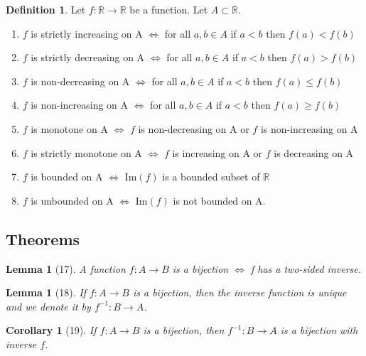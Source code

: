 \documentclass[12pt]{article}
\newtheorem{lem}[thm]{Lemma}  %
\newtheorem{cor}[thm]{Corollary}
\theoremstyle{definition}
\newtheorem{defn}[thm]{Definition}
\theoremstyle{remark}
\numberwithin{equation}{section}
\newcommand\R{\mathbb R}    %
\begin{document}
\begin{defn}
        Let $f:\R \rightarrow \R$ be a function. Let $A \subset \R$.
        \begin{enumerate}
                \item $f$ is strictly increasing on A $\iff$ for all $a,b \in A$ if $a<b$ then $f(a) < f(b)$
                \item $f$ is strictly decreasing on A $\iff$ for all $a,b \in A$ if $a < b$ then $f(a) > f(b)$
                \item $f$ is non-decreasing on A $\iff$ for all $a,b \in A$ if $a < b$ then $f(a) \leq f(b)$
                \item $f$ is non-increasing on A $\iff$ for all $a,b \in A$ if $a < b$ then $f(a) \geq f(b)$
                \item $f$ is monotone on A $\iff$ $f$ is non-decreasing on A or $f$ is non-increasing on A
                \item $f$ is strictly monotone on A $\iff$ $f$ is increasing on A or $f$ is decreasing on A
                \item $f$ is bounded on A $\iff$ $\text{Im}(f)$ is a bounded subset of $\R$
                \item $f$ is unbounded on A $\iff$ $\text{Im}(f)$ is not bounded on A.
        \end{enumerate}
\end{defn}






\subsection{Theorems}


\begin{lem}[17]
        A function $f:A \rightarrow B$ is a bijection $\iff$ f has a two-sided inverse.
\end{lem}



\begin{lem}[18]
        If $f:A \rightarrow B$ is a bijection, then the inverse function is unique and we denote it by $f^{-1}:B\rightarrow A$.
\end{lem}


\begin{cor}[19]
        If $f:A \rightarrow B$ is a bijection, then $f^{-1}:B \rightarrow A$ is a bijection with inverse $f$.
\end{cor}
\end{document}
